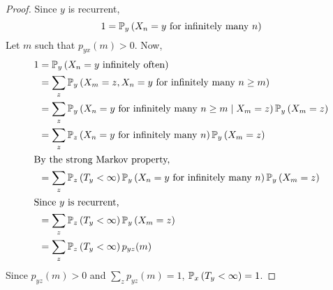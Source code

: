 \begin{proof}
	Since \( y \) is recurrent,
	\[
		1 = \mathbb{P}_{y}\left({X_n = y \text{ for infinitely many } n}\right)
	\]
	Let \( m \) such that \( p_{yx}(m) > 0 \).
	Now,
	\begin{align*}
		1 & = \mathbb{P}_{y}\left({X_n = y \text{ infinitely often}}\right)                                                       \\
		  & = \sum_z \mathbb{P}_{y}\left({X_m = z, X_n = y \text{ for infinitely many } n \geq m}\right)                          \\
		  & = \sum_z \mathbb{P}_{y}\left({X_n = y \text{ for infinitely many } n \geq m \mid X_m = z}\right) \mathbb{P}_{y}\left({X_m = z}\right)    \\
		  & = \sum_z \mathbb{P}_{z}\left({X_n = y \text{ for infinitely many } n}\right) \mathbb{P}_{y}\left({X_m = z}\right)                        \\
		\intertext{By the strong Markov property,}
		  & = \sum_z \mathbb{P}_{z}\left({T_y < \infty}\right) \mathbb{P}_{y}\left({X_n = y \text{ for infinitely many } n}\right) \mathbb{P}_{y}\left({X_m = z}\right) \\
		\intertext{Since \( y \) is recurrent,}
		  & = \sum_z \mathbb{P}_{z}\left({T_y < \infty}\right) \mathbb{P}_{y}\left({X_m = z}\right)                                                  \\
		  & = \sum_z \mathbb{P}_{z}\left({T_y < \infty}\right) p_{yz}(m)
	\end{align*}
	Since \( p_{yz}(m) > 0 \) and \( \sum_z p_{yz}(m) = 1 \), \( \mathbb{P}_{x}\left({T_y < \infty}\right) = 1 \).
\end{proof}
